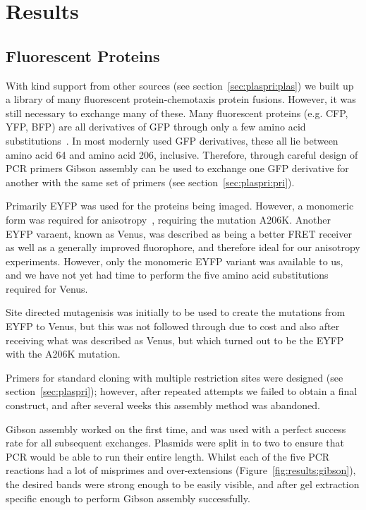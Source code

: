 \documentclass[../main.tex]{subfiles}
\begin{document}
\section{Results}


\subsection{Fluorescent Proteins}

With kind support from other sources (see section~\ref{sec:plaspri:plas}) we built up a library of many fluorescent protein-chemotaxis protein fusions. However, it was still necessary to exchange many of these. Many fluorescent proteins (e.g. CFP, YFP, BFP) are all derivatives of GFP through only a few amino acid substitutions~\citep{tsien98}. In most modernly used GFP derivatives, these all lie between amino acid 64 and amino acid 206, inclusive. Therefore, through careful design of PCR primers Gibson assembly can be used to exchange one GFP derivative for another with the same set of primers (see section~\ref{sec:plaspri:pri}).

Primarily EYFP was used for the proteins being imaged. However, a monomeric form was required for anisotropy~\citep{vaknin07}, requiring the mutation A206K. Another EYFP varaent, known as Venus, was described as being a better FRET receiver~\citep{nagai02} as well as a generally improved fluorophore, and therefore ideal for our anisotropy experiments. However, only the monomeric EYFP variant was available to us, and we have not yet had time to perform the five amino acid substitutions required for Venus.

Site directed mutagenisis was initially to be used to create the mutations from EYFP to Venus, but this was not followed through due to cost and also after receiving what was described as Venus, but which turned out to be the EYFP with the A206K mutation.

Primers for standard cloning with multiple restriction sites were designed (see section~\ref{sec:plaspri}); however, after repeated attempts we failed to obtain a final construct, and after several weeks this assembly method was abandoned.

Gibson assembly worked on the first time, and was used with a perfect success rate for all subsequent exchanges. Plasmids were split in to two to ensure that PCR would be able to run their entire length. Whilst each of the five PCR reactions had a lot of misprimes and over-extensions (Figure~\ref{fig:results:gibson}), the desired bands were strong enough to be easily visible, and after gel extraction specific enough to perform Gibson assembly successfully.
\end{document}
